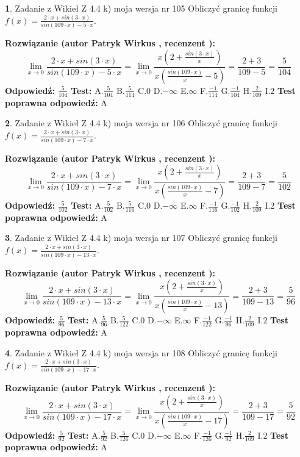 \documentclass[12pt, a4paper]{article}
\theoremstyle{definition} %
\newtheorem{zad}{}
\newcommand{\zadStart}[1]{\begin{zad}#1\newline}
\newcommand{\zadStop}{\end{zad}}
\newcommand{\rozwStart}[2]{\noindent \textbf{Rozwiązanie (autor #1 , recenzent #2): }\newline}
\newcommand{\rozwStop}{\newline}
\newcommand{\odpStart}{\noindent \textbf{Odpowiedź:}\newline}
\newcommand{\odpStop}{\newline}
\newcommand{\testStart}{\noindent \textbf{Test:}\newline}
\newcommand{\testStop}{\newline}
\newcommand{\kluczStart}{\noindent \textbf{Test poprawna odpowiedź:}\newline}
\newcommand{\kluczStop}{\newline}
\begin{document}
\zadStart{Zadanie z Wikieł Z 4.4 k) moja wersja nr 105}
Obliczyć granicę funkcji $f(x)=\frac{2\cdot x +sin(3\cdot x)}{sin(109\cdot x) -5\cdot x}$.
\zadStop
\rozwStart{Patryk Wirkus}{}
$$\lim\limits_{x\to 0}\frac{2\cdot x +sin(3\cdot x)}{sin(109\cdot x) -5\cdot x}
=\lim\limits_{x\to 0}\frac{x(2+\frac{sin(3\cdot x)}{x})}{x(\frac{sin(109\cdot x)}{x}-5)}
=\frac{2+3}{109-5} = \frac{5}{104}$$
\rozwStop
\odpStart
$\frac{5}{104}$
\odpStop
\testStart
A.$\frac{5}{104}$
B.$\frac{5}{114}$
C.$0$
D.$-\infty$
E.$\infty$
F.$\frac{-1}{114}$
G.$\frac{-1}{104}$
H.$\frac{2}{109}$
I.$2$
\testStop
\kluczStart
A
\kluczStop



\zadStart{Zadanie z Wikieł Z 4.4 k) moja wersja nr 106}
Obliczyć granicę funkcji $f(x)=\frac{2\cdot x +sin(3\cdot x)}{sin(109\cdot x) -7\cdot x}$.
\zadStop
\rozwStart{Patryk Wirkus}{}
$$\lim\limits_{x\to 0}\frac{2\cdot x +sin(3\cdot x)}{sin(109\cdot x) -7\cdot x}
=\lim\limits_{x\to 0}\frac{x(2+\frac{sin(3\cdot x)}{x})}{x(\frac{sin(109\cdot x)}{x}-7)}
=\frac{2+3}{109-7} = \frac{5}{102}$$
\rozwStop
\odpStart
$\frac{5}{102}$
\odpStop
\testStart
A.$\frac{5}{102}$
B.$\frac{5}{116}$
C.$0$
D.$-\infty$
E.$\infty$
F.$\frac{-1}{116}$
G.$\frac{-1}{102}$
H.$\frac{2}{109}$
I.$2$
\testStop
\kluczStart
A
\kluczStop



\zadStart{Zadanie z Wikieł Z 4.4 k) moja wersja nr 107}
Obliczyć granicę funkcji $f(x)=\frac{2\cdot x +sin(3\cdot x)}{sin(109\cdot x) -13\cdot x}$.
\zadStop
\rozwStart{Patryk Wirkus}{}
$$\lim\limits_{x\to 0}\frac{2\cdot x +sin(3\cdot x)}{sin(109\cdot x) -13\cdot x}
=\lim\limits_{x\to 0}\frac{x(2+\frac{sin(3\cdot x)}{x})}{x(\frac{sin(109\cdot x)}{x}-13)}
=\frac{2+3}{109-13} = \frac{5}{96}$$
\rozwStop
\odpStart
$\frac{5}{96}$
\odpStop
\testStart
A.$\frac{5}{96}$
B.$\frac{5}{122}$
C.$0$
D.$-\infty$
E.$\infty$
F.$\frac{-1}{122}$
G.$\frac{-1}{96}$
H.$\frac{2}{109}$
I.$2$
\testStop
\kluczStart
A
\kluczStop



\zadStart{Zadanie z Wikieł Z 4.4 k) moja wersja nr 108}
Obliczyć granicę funkcji $f(x)=\frac{2\cdot x +sin(3\cdot x)}{sin(109\cdot x) -17\cdot x}$.
\zadStop
\rozwStart{Patryk Wirkus}{}
$$\lim\limits_{x\to 0}\frac{2\cdot x +sin(3\cdot x)}{sin(109\cdot x) -17\cdot x}
=\lim\limits_{x\to 0}\frac{x(2+\frac{sin(3\cdot x)}{x})}{x(\frac{sin(109\cdot x)}{x}-17)}
=\frac{2+3}{109-17} = \frac{5}{92}$$
\rozwStop
\odpStart
$\frac{5}{92}$
\odpStop
\testStart
A.$\frac{5}{92}$
B.$\frac{5}{126}$
C.$0$
D.$-\infty$
E.$\infty$
F.$\frac{-1}{126}$
G.$\frac{-1}{92}$
H.$\frac{2}{109}$
I.$2$
\testStop
\kluczStart
A
\kluczStop
\end{document}
